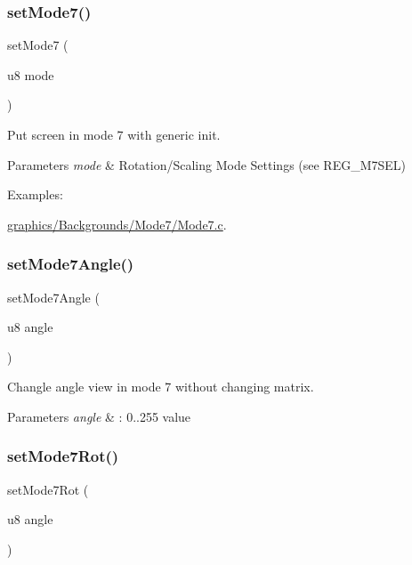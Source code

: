 \subsubsection{\texorpdfstring{set\+Mode7()}{setMode7()}}
{\footnotesize\ttfamily set\+Mode7 (\begin{DoxyParamCaption}\item[{u8}]{mode }\end{DoxyParamCaption})}



Put screen in mode 7 with generic init. 


\begin{DoxyParams}{Parameters}
{\em mode} & Rotation/\+Scaling Mode Settings (see R\+E\+G\+\_\+\+M7\+S\+EL) \\
\hline
\end{DoxyParams}
\begin{Desc}
\item[Examples\+: ]\par
\hyperlink{a00465}{graphics/\+Backgrounds/\+Mode7/\+Mode7.\+c}.\end{Desc}
\mbox{\label{a00416_ac4b1645f376fa266f0e614a1d7903a31}} 
\subsubsection{\texorpdfstring{set\+Mode7\+Angle()}{setMode7Angle()}}
{\footnotesize\ttfamily set\+Mode7\+Angle (\begin{DoxyParamCaption}\item[{u8}]{angle }\end{DoxyParamCaption})}



Changle angle view in mode 7 without changing matrix. 


\begin{DoxyParams}{Parameters}
{\em angle} & \+: 0..255 value \\
\hline
\end{DoxyParams}
\mbox{\label{a00416_a4d332cdc88b26fc9ec2cdd4f6710ce8c}} 
\subsubsection{\texorpdfstring{set\+Mode7\+Rot()}{setMode7Rot()}}
{\footnotesize\ttfamily set\+Mode7\+Rot (\begin{DoxyParamCaption}\item[{u8}]{angle }\end{DoxyParamCaption})}



